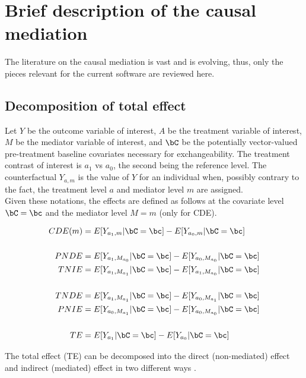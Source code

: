\documentclass[dvipdfmx,10pt]{article}
\date{\today}
\title{}
\begin{document}
\tableofcontents

\sloppy
\newpage
\section{Brief description of the causal mediation}
\label{sec:orgad2995c}

The literature on the causal mediation is vast \cite{vanderweeleExplanationCausalInference2015} and is evolving, thus, only the pieces relevant for the current software are reviewed here.

\subsection{Decomposition of total effect}
\label{sec:org9bb8e70}
Let \(Y\) be the outcome variable of interest, \(A\) be the treatment variable of interest, \(M\) be the mediator variable of interest, and \(\bC\) be the potentially vector-valued pre-treatment baseline covariates necessary for exchangeability. The treatment contrast of interest is \(a_{1}\) vs \(a_{0}\), the second being the reference level. The counterfactual \(Y_{a,m}\) is the value of \(Y\) for an individual when, possibly contrary to the fact, the treatment level \(a\) and mediator level \(m\) are assigned.\\

Given these notations, the effects are defined as follows at the covariate level \(\bC = \bc\) and the mediator level \(M = m\) (only for CDE).

\begin{align*}
  CDE(m) &= E[Y_{a_{1},m} | \bC = \bc] - E[Y_{a_{0},m} | \bC = \bc]\\
  \\
  PNDE &= E[Y_{a_{1},M_{a_{0}}} | \bC = \bc] - E[Y_{a_{0},M_{a_{0}}} | \bC = \bc]\\
  TNIE &= E[Y_{a_{1},M_{a_{1}}} | \bC = \bc] - E[Y_{a_{1},M_{a_{0}}} | \bC = \bc]\\
  \\
  TNDE &= E[Y_{a_{1},M_{a_{1}}} | \bC = \bc] - E[Y_{a_{0},M_{a_{1}}} | \bC = \bc]\\
  PNIE &= E[Y_{a_{0},M_{a_{1}}} | \bC = \bc] - E[Y_{a_{0},M_{a_{0}}} | \bC = \bc]\\
  \\
  TE &= E[Y_{a_{1}} | \bC = \bc] - E[Y_{a_{0}} | \bC = \bc]\\
\end{align*}

The total effect (TE) can be decomposed into the direct (non-mediated) effect and indirect (mediated) effect in two different ways \cite{robinsIdentifiabilityExchangeabilityDirect1992,vanderweeleThreewayDecompositionTotal2013}.\\
\end{document}
